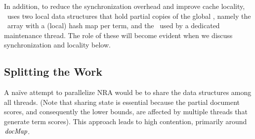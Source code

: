 
In addition, to reduce the synchronization overhead and improve cache locality, \alg\ uses 
two local data structures that hold partial copies of the global \DMap, namely the \TMap\ array with a (local) hash map per term, 
and the \LDMap\ used by a dedicated maintenance thread. The role of these will become evident 
when we discuss synchronization and locality below.

\subsection{Splitting the Work}
\label{sssec:tasks}


A na\"ive attempt to parallelize NRA would be to 
share the data structures among all threads. (Note that sharing state is essential because the partial document scores, and consequently the lower bounds, are affected by multiple threads that generate term scores). This approach 
leads to high contention, primarily around $\textit{docMap}$.%

